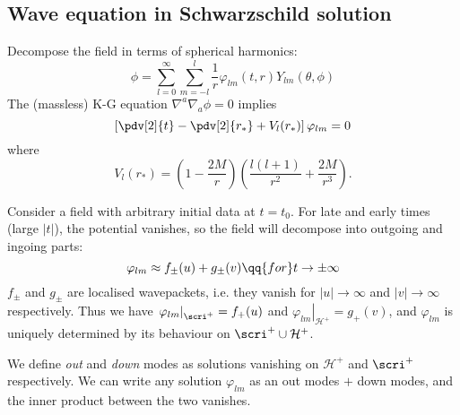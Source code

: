 \documentclass{jknotes}
\begin{document}
\subsection{Wave equation in Schwarzschild solution}
Decompose the field in terms of spherical harmonics:
\begin{equation}
    \phi  = \sum^\infty_{l=0}\sum^{l}_{m=-l}\frac{1}{r}\varphi_{lm}(t,r)Y_{lm}(\theta,\phi)
\end{equation}
The (massless) K-G equation \(\nabla^a\nabla_a\phi=0\) implies
\begin{equation}
    \left[\pdv[2]{t}-\pdv[2]{r_*}+V_l(r_*)\right]\varphi_{lm}=0
\end{equation}
where
\begin{equation}
    V_l(r_*) = \left(1-\frac{2M}{r}\right)\left(\frac{l(l+1)}{r^2} + \frac{2M}{r^3}\right).
\end{equation}

\begin{figure}[H]
    \centering
\end{figure}

Consider a field with arbitrary initial data at \(t=t_0\). For late and early times (large \(|t|\)), the potential vanishes, so the field will decompose into outgoing and ingoing parts:
\begin{equation}
    \varphi_{lm} \approx f_\pm(u) + g_\pm(v) \qq{for} t\to \pm\infty
\end{equation}
\(f_\pm\) and \(g_\pm\) are localised wavepackets, i.e. they vanish for \(|u|\to\infty\) and \(|v|\to\infty\) respectively. Thus we have \(\left.\varphi_{lm}\right|_{\scri^+} = f_+(u)\) and \(\left.\varphi_{lm}\right|_{\mathcal{H}^+}=g_+(v)\), and \(\varphi_{lm}\) is uniquely determined by its behaviour on \(\scri^+\cup\mathcal{H}^+\). 

We define \emph{out} and \emph{down} modes as solutions vanishing on \(\mathcal{H}^+\) and \(\scri^+\) respectively. We can write any solution \(\varphi_{lm}\) as an out modes \(+\) down modes, and the inner product between the two vanishes.
\end{document}
